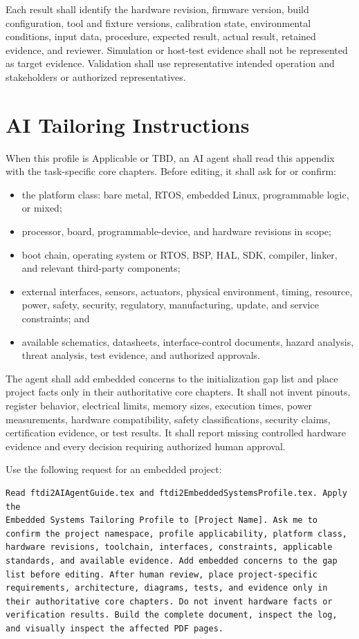 Each result shall identify the hardware revision, firmware version, build
configuration, tool and fixture versions, calibration state, environmental
conditions, input data, procedure, expected result, actual result, retained
evidence, and reviewer. Simulation or host-test evidence shall not be
represented as target evidence. Validation shall use representative intended
operation and stakeholders or authorized representatives.

\section{AI Tailoring Instructions}
When this profile is Applicable or TBD, an AI agent shall read this appendix
with the task-specific core chapters. Before editing, it shall ask for or
confirm:

\begin{itemize}
\item the platform class: bare metal, RTOS, embedded Linux, programmable logic,
or mixed;
\item processor, board, programmable-device, and hardware revisions in scope;
\item boot chain, operating system or RTOS, BSP, HAL, SDK, compiler, linker,
and relevant third-party components;
\item external interfaces, sensors, actuators, physical environment, timing,
resource, power, safety, security, regulatory, manufacturing, update, and
service constraints; and
\item available schematics, datasheets, interface-control documents, hazard
analysis, threat analysis, test evidence, and authorized approvals.
\end{itemize}

The agent shall add embedded concerns to the initialization gap list and place
project facts only in their authoritative core chapters. It shall not invent
pinouts, register behavior, electrical limits, memory sizes, execution times,
power measurements, hardware compatibility, safety classifications, security
claims, certification evidence, or test results. It shall report missing
controlled hardware evidence and every decision requiring authorized human
approval.

Use the following request for an embedded project:

\begin{verbatim}
Read ftdi2AIAgentGuide.tex and ftdi2EmbeddedSystemsProfile.tex. Apply the
Embedded Systems Tailoring Profile to [Project Name]. Ask me to
confirm the project namespace, profile applicability, platform class,
hardware revisions, toolchain, interfaces, constraints, applicable
standards, and available evidence. Add embedded concerns to the gap
list before editing. After human review, place project-specific
requirements, architecture, diagrams, tests, and evidence only in
their authoritative core chapters. Do not invent hardware facts or
verification results. Build the complete document, inspect the log,
and visually inspect the affected PDF pages.
\end{verbatim}

